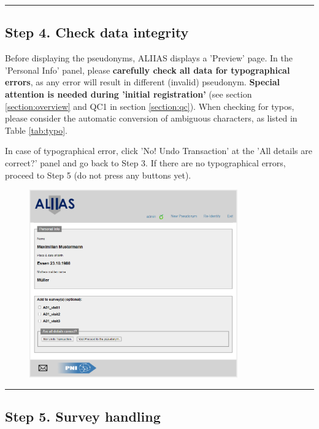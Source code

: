 \par\noindent\rule{\textwidth\color{pniblue}}{0.4pt}
\subsection*{Step 4. Check data integrity}

Before displaying the pseudonyms, ALIIAS displays a 'Preview' page. In the 'Personal Info' panel, please \textbf{carefully check all data for typographical errors}, as any error will result in different (invalid) pseudonym. \textbf{Special attention is needed during 'initial registration'} (see section \ref{section:overview} and QC1 in section \ref{section:qc}). When checking for typos, please consider the automatic conversion of ambiguous characters, as listed in Table \ref{tab:typo}.

\large

In case of typographical error, click 'No! Undo Transaction' at the 'All details are correct?' panel and go back to Step 3. 
If there are no typographical errors, proceed to Step 5 (do not press any buttons yet).

\begin{figure}[H]
\includegraphics[width=0.8\textwidth]{docs/fig/04_preview.PNG}
\end{figure}

\par\noindent\rule{\textwidth\color{pniblue}}{0.4pt}
\subsection*{Step 5. Survey handling}

